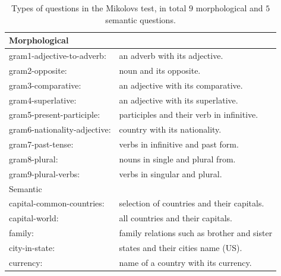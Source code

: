 \begin{table}[h]
\centering

\begin{tabular}{ll}
        \toprule
{Morphological} & \\         \midrule

gram1-adjective-to-adverb:& an adverb with its adjective.            \\ \hline
gram2-opposite: &noun and its opposite.                          \\ \hline
gram3-comparative: & an adjective with its comparative.                                           \\ \hline
gram4-superlative:&an adjective with its superlative.                                                    \\ \hline
gram5-present-participle:&participles and their verb in infinitive.                                           \\ \hline
gram6-nationality-adjective:&country with its nationality.                                                                \\ \hline
gram7-past-tense: &verbs in infinitive and past form.                                                             \\ \hline
gram8-plural:& nouns in single and plural from.                                                         \\ \hline
gram9-plural-verbs: &verbs in singular and plural.                                                          \\ 
\midrule
\midrule
{Semantic}&\\   
\midrule

capital-common-countries:                 &           selection of countries and their capitals.\\ \hline
capital-world:          &        all countries and their capitals.    \\ \hline
family:     &             family relations such as brother and sister  \\ \hline
city-in-state:   &      states and their cities name (US). \\ \hline
currency:    &        name of a country with its currency.  \\
\bottomrule
\end{tabular}
 \caption{Types of questions in the Mikolovs test, in total $9$
  morphological and $5$ semantic questions.} 
  \label{table:analogy_types}
\end{table}

